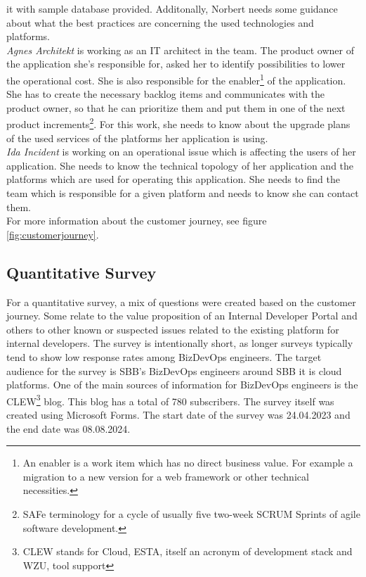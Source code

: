 \documentclass[a4paper,12pt]{article}
\begin{document}
    it with sample database provided.
    Additonally, Norbert needs some guidance about what the best practices are concerning the used technologies and platforms.\\
    \textit{Agnes Architekt} is working as an IT architect in the team.
    The product owner of the application she's responsible for, asked her to identify possibilities to lower the operational cost.
    She is also responsible for the enabler\footnote{An enabler is a work item which has no direct business value.
    For example a migration to a new version for a web framework or other technical necessities.} of the application.
    She has to create the necessary backlog items and communicates with the product owner, so that he can prioritize
    them and put them in one of the next product increments\footnote{SAFe terminology for a cycle of usually five two-week SCRUM Sprints of agile software development.}.
    For this work, she needs to know about the upgrade plans of the used services of the platforms her application is using.     \\
    \textit{Ida Incident} is working on an operational issue which is affecting the users of her application.
    She needs to know the technical topology of her application and the platforms which are used for operating this application.
    She needs to find the team which is responsible for a given platform and needs to know she can contact them.\\
    For more information about the customer journey, see figure \ref{fig:customerjourney}.

    \subsection{Quantitative Survey}
    \label{subsec:quansur}
    For a quantitative survey, a mix of questions were created based on the customer journey.
    Some relate to the value proposition of an Internal Developer Portal and others to other known or suspected issues
    related to the existing platform for internal developers.
    The survey is intentionally short, as longer surveys typically tend to show low response rates among BizDevOps engineers.
    The target audience for the survey is SBB's BizDevOps engineers around SBB it is cloud platforms.
    One of the main sources of information for BizDevOps engineers is the CLEW\footnote{CLEW stands for Cloud, ESTA,
        itself an acronym of development stack and WZU, tool support} blog.
    This blog has a total of 780 subscribers.
    The survey itself was created using Microsoft Forms.
    The start date of the survey was 24.04.2023 and the end date was 08.08.2024.
\end{document}
